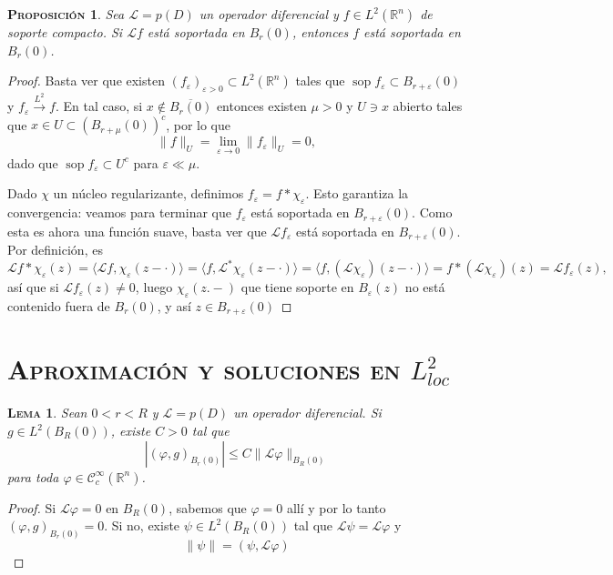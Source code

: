 \documentclass[11pt]{article}
\theoremstyle{colored}
\DeclareMathOperator{\sop}{sop}
\newtheorem{proposition}{\scshape Proposición}
\newtheorem{lemma}{\scshape Lema}
\newcommand{\R}{\mathbb{R}}
\newcommand{\C}{\mathscr{C}}
\newcommand{\eps}{\varepsilon}
\newcommand{\ev}[1]{\langle #1 \rangle}
\renewcommand{\L}{\mathscr{L}}
\begin{document}
\begin{proposition}Sea $\L = p(D)$ un operador diferencial y $f \in L^2(\R^n)$ de soporte compacto. Si $\L f$ está soportada en $B_r(0)$, entonces $f$ está soportada en $B_r(0)$.
\end{proposition}
\begin{proof} Basta ver que existen $(f_\eps)_{\eps > 0} \subset L^2(\R^n)$ tales que $\sop f_\eps \subset B_{r+\eps}(0)$ y $f_\eps \xrightarrow{L^2} f$. En tal caso, si $x \not \in \overline{B_r(0)}$ entonces existen $\mu > 0$ y $U \ni x $ abierto tales que $x \in U \subset (B_{r+\mu}(0))^c$, por lo que
\[
\|f\|_U = \lim_{\eps \to 0}\|f_\eps\|_U = 0,
\]
dado que $\sop f_\eps \subset U^c$ para $\eps \ll \mu$.

Dado $\chi$ un núcleo regularizante, definimos $f_\eps = f \ast \chi_\eps$. Esto garantiza la convergencia: veamos para terminar que $f_\eps$ está soportada en $B_{r+\eps}(0)$. Como esta es ahora una función suave, basta ver que $\L f_\eps$ está soportada en $B_{r+\eps}(0)$. Por definición, es
\[
\L f \ast \chi_\eps(z) = \ev{\L f,\chi_\eps(z-\cdot)} = \ev{f,\L^\ast\chi_\eps(z-\cdot)} = \ev{f,(\L\chi_\eps)(z-\cdot)} = f \ast (\L \chi_\eps
)(z) = \L f_\eps(z),
\]
así que si $\L f_\eps(z) \neq 0$, luego $\chi_\eps(z. -)$ que tiene soporte en $B_\eps(z)$ no está contenido fuera de $B_r(0)$, y así $z \in B_{r+\eps}(0)$
\end{proof}

\section{\scshape Aproximación y soluciones en $L^2_{loc}$}

\begin{lemma} Sean $0 < r < R$ y $\L = p(D)$ un operador diferencial. Si $g \in L^2(B_R(0))$, existe $C > 0$ tal que
\[
|(\varphi,g)_{B_r(0)}| \leq C\|\L \varphi\|_{B_R(0)}
\]
para toda $\varphi \in \C_c^\infty(\R^n)$.
\end{lemma}
\begin{proof} Si $\L \varphi = 0$ en $B_R(0)$, sabemos que $\varphi = 0$ allí y por lo tanto $(\varphi,g)_{B_r(0)} = 0$. Si no, existe $\psi \in L^2(B_R(0))$ tal que $\L \psi = \L \varphi$ y 
\[
\|\psi\| = (\psi,\L \varphi)
\]
\end{proof}
\end{document}
